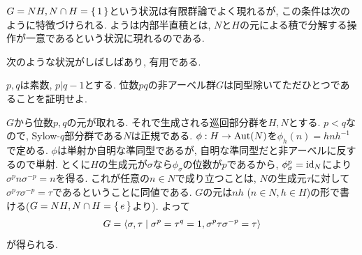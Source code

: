 
$G=NH, N\cap H = \set{1}$という状況は有限群論でよく現れるが, この条件は次のように特徴づけられる. ようは内部半直積とは, $N$と$H$の元による積で分解する操作が一意であるという状況に現れるのである.



次のような状況がしばしばあり, 有用である.

 \begin{egprob} $p,q$は素数, $p|q-1$とする. 位数$pq$の非アーベル群$G$は同型除いてただひとつであることを証明せよ.
 \end{egprob}
\begin{egans}
$G$から位数$p,q$の元が取れる. それで生成される巡回部分群を$H,N$とする. $p<q$なので, Sylow-$q$部分群である$N$は正規である. $\phi:H\to \mathrm{Aut}(N)$を$\phi_h(n) = hnh^{-1}$で定める. $\phi$は単射か自明な準同型であるが, 自明な準同型だと非アーベルに反するので単射.  とくに$H$の生成元が$\sigma$なら$\phi_\sigma$の位数が$p$であるから, $\phi_{\sigma}^{p} = \mathrm{id}_N$により$\sigma^{p} n \sigma^{-p} = n$を得る. これが任意の$n\in N$で成り立つことは, $N$の生成元$\tau$に対して$\sigma^{p} \tau \sigma^{-p} = \tau$であるということに同値である. $G$の元は$nh$ ($n\in N, h\in H$)の形で書ける($G=NH, N\cap H = \set{e}$より). よって
\[G = \langle \sigma,\tau\mid \sigma^p = \tau^{q} = 1, \sigma^p\tau\sigma^{-p} = \tau \rangle\]
が得られる.
\end{egans}



